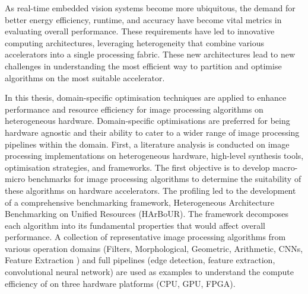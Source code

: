 
As real-time embedded vision systems become more ubiquitous, the demand for better energy efficiency, runtime, and accuracy have become vital metrics in evaluating overall performance. These requirements have led to innovative computing architectures, leveraging heterogeneity that combine various accelerators into a single processing fabric. These new architectures lead to new challenges in understanding the most efficient way to partition and optimise algorithms on the most suitable accelerator. 

In this thesis, domain-specific optimisation techniques are applied to enhance performance and resource efficiency for image processing algorithms on heterogeneous hardware. Domain-specific optimisations are preferred for being hardware agnostic and their ability to cater to a wider range of image processing pipelines within the domain. First, a literature analysis is conducted on image processing implementations on heterogeneous hardware, high-level synthesis tools, optimisation strategies, and frameworks. The first objective is to develop macro-micro benchmarks for image processing algorithms to determine the suitability of these algorithms on hardware accelerators. The profiling led to the development of a comprehensive benchmarking framework, Heterogeneous Architecture Benchmarking on Unified Resources (HArBoUR). The framework decomposes each algorithm into its fundamental properties that would affect overall performance. A collection of representative image processing algorithms from various operation domains (\eg Filters, Morphological, Geometric, Arithmetic, CNNs, Feature Extraction ) and full pipelines (\eg edge detection, feature extraction, convolutional neural network) are used as examples to understand the compute efficiency of on three hardware platforms (CPU, GPU, FPGA).

